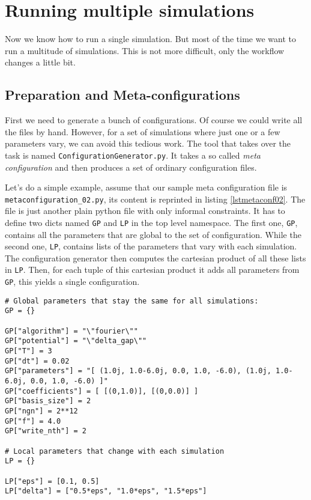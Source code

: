\documentclass[a4paper,10pt]{report}
\begin{document}
\section{Running multiple simulations}

Now we know how to run a single simulation. But most of the time we want to run
a multitude of simulations. This is not more difficult, only the workflow changes
a little bit.

\subsection{Preparation and Meta-configurations}

First we need to generate a bunch of configurations. Of course we could write all
the files by hand. However, for a set of simulations where just one or a few
parameters vary, we can avoid this tedious work. The tool that takes over the
task is named \texttt{ConfigurationGenerator.py}. It takes a so called \emph{meta configuration}
and then produces a set of ordinary configuration files.

Let's do a simple example, assume that our sample meta configuration file is \texttt{metaconfiguration\_02.py},
its content is reprinted in listing \ref{lstmetaconf02}. The file is just another
plain python file with only informal constraints. It has to define two dicts named
\texttt{GP} and \texttt{LP} in the top level namespace. The first one, \texttt{GP},
contains all the parameters that are global to the set of configuration. While the second
one, \texttt{LP}, contains lists of the parameters that vary with each simulation.
The configuration generator then computes the cartesian product of all these
lists in \texttt{LP}. Then, for each tuple of this cartesian product it adds all
parameters from \texttt{GP}, this yields a single configuration.

\begin{lstlisting}[float=tp,frame=single,label=lstmetaconf02,caption={Sample meta configuration \texttt{metaconfiguration\_02.py}}]
# Global parameters that stay the same for all simulations:
GP = {}

GP["algorithm"] = "\"fourier\""
GP["potential"] = "\"delta_gap\""
GP["T"] = 3
GP["dt"] = 0.02
GP["parameters"] = "[ (1.0j, 1.0-6.0j, 0.0, 1.0, -6.0), (1.0j, 1.0-6.0j, 0.0, 1.0, -6.0) ]"
GP["coefficients"] = [ [(0,1.0)], [(0,0.0)] ]
GP["basis_size"] = 2
GP["ngn"] = 2**12
GP["f"] = 4.0
GP["write_nth"] = 2

# Local parameters that change with each simulation
LP = {}

LP["eps"] = [0.1, 0.5]
LP["delta"] = ["0.5*eps", "1.0*eps", "1.5*eps"]
\end{lstlisting}
\end{document}
